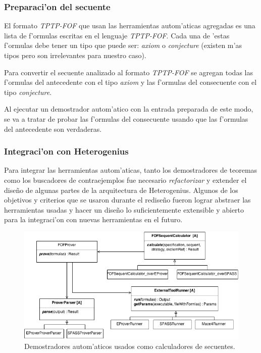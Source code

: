 \subsubsection{Preparaci'on del secuente}

El formato \textit{TPTP-FOF} que usan las herramientas autom'aticas agregadas es una lista de f'ormulas escritas en el lenguaje \textit{TPTP-FOF}. Cada una de 'estas f'ormulas debe tener un tipo que puede ser: \textit{axiom} o \textit{conjecture} (existen m'as tipos pero son irrelevantes para nuestro caso).

Para convertir el secuente analizado al formato \textit{TPTP-FOF} se agregan todas las f'ormulas del antecedente con el tipo \textit{axiom} y las f'ormulas del consecuente con el tipo \textit{conjecture}. 

Al ejecutar un demostrador autom'atico con la entrada preparada de este modo, se va a tratar de probar las f'ormulas del consecuente usando que las f'ormulas del antecedente son verdaderas.


\subsubsection{Integraci'on con Heterogenius}

Para integrar las herramientas autom'aticas, tanto los demostradores de teoremas como los buscadores de contraejemplos fue necesario \textit{refactorizar} y extender el diseño de algunas partes de la arquitectura de Heterogenius. Algunos de los objetivos y criterios que se usaron durante el rediseño fueron lograr abstraer las herramientas usadas y hacer un diseño lo suficientemente extensible y abierto para la integraci'on con nuevas herramientas en el futuro.

\begin{figure}[H]
	\includegraphics[width=450px, angle=90]{img/arq_prover.png}
	\centering
	\caption{Demostradores autom'aticos usados como calculadores de secuentes.}
\end{figure}

